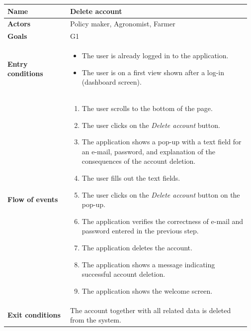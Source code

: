 \begin{table}[H]
    \centering
	\begin{tabular}{@{}p{0.25\linewidth} p{0.72\linewidth}@{}}
\toprule
		\textbf{Name}               & Delete account\\
		\midrule
		\textbf{Actors}             & Policy maker, Agronomist, Farmer\\
		\midrule
		\textbf{Goals}              & G1 \\
		\midrule
		
		\textbf{Entry conditions}   & \begin{itemize}[leftmargin=.4cm,noitemsep,topsep=0pt,before=\vspace{-3mm},after=\vspace{-4mm}]
		    \item The user is already logged in to the application.
		    \item The user is on a first view shown after a log-in (dashboard screen).
		\end{itemize}\\
		\midrule
		
		\textbf{Flow of events}     & \begin{enumerate}[leftmargin=.4cm,noitemsep,topsep=0pt,before=\vspace{-3mm},after=\vspace{-4mm}]
		    \item The user scrolls to the bottom of the page.
		    \item The user clicks on the \textit{Delete account} button.
		    \item The application shows a pop-up with a text field for an e-mail, password, and explanation of the consequences of the account deletion.
		    \item The user fills out the text fields.
		    \item The user clicks on the \textit{Delete account} button on the pop-up.
		    \item The application verifies the correctness of e-mail and password entered in the previous step.
		    \item The application deletes the account.
		    \item The application shows a message indicating successful account deletion.
		    \item The application shows the welcome screen.
		\end{enumerate}\\
		\midrule
		\textbf{Exit conditions}    & The account together with all related data is deleted from the system. \\
		\midrule
		

\end{tabular}
\end{table}
